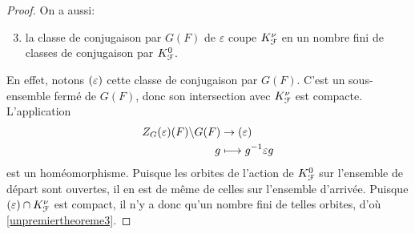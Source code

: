 \documentclass[11pt]{article}
\numberwithin{equation}{section}\providecommand{\og}{«\,}\providecommand{\fg}{\,»}
\let\mathcal \EuScript
\newcommand{\NoChangel}[1]{%
\expandafter\let\csname old\string#1\endcsname=#1
\let#1=\relax
\newcommand{#1}{\mathcode`l="716C\csname old\string#1\endcsname\mathcode`l="7160 }%
}
\let\epsilon\varepsilon
\newcommand\mto{\mathchoice{\longmapsto}{\mapsto}{\mapsto}{\mapsto}}
\newcommand{\Cl}{\mathrm{Cl}}\NoChangel{\Cl}
\newcommand{\cF}{\mathcal{F}}
\theoremstyle{plain}
\theoremstyle{definition}
\begin{document}
\begin{proof}
On a aussi:
\begin{enumerate}\setcounter{enumi}{2}
\item\label{unpremiertheoreme3}
la classe de conjugaison par $G(F)$ de $\epsilon$ coupe $K_{\cF}^{\nu}$ en un nombre fini de classes de conjugaison par $K_{\cF}^0$.
\end{enumerate}

En effet, notons $\Cl(\epsilon)$ cette classe de conjugaison par $G(F)$. C'est un sous-ensemble fermé de $G(F)$, donc son intersection avec $K_{\cF}^{\nu}$ est compacte. L'application
\begin{align*}
Z_{G}(\epsilon)(F)\backslash G(F)&\to \Cl(\epsilon)\\
g&\mto g^{-1}\epsilon g
\end{align*}
est un homéomorphisme. Puisque les orbites de l'action de $K_{\cF}^{0}$ sur l'ensemble de départ sont ouvertes, il en est de même de celles sur l'ensemble d'arrivée. Puisque $\Cl(\epsilon)\cap K_{\cF}^{\nu}$ est compact, il n'y a donc qu'un nombre fini de telles orbites, d'où \eqref{unpremiertheoreme3}.


\end{proof}
\end{document}
